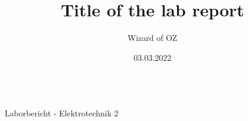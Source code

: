 \documentclass[11pt,a4paper]{article}
\author{Wizard of OZ}
\date{03.03.2022}
\title{Title of the lab report}
\begin{document}
\begin{center}
  \vspace*{0cm}
  \makeatletter
  \Huge{ \noindent
    \textbf{\@title}\\
  }
  \normalsize{
    Laborbericht - Elektrotechnik 2
  }
  \makeatother
  \vspace{1cm}
\end{center}










\end{document}
